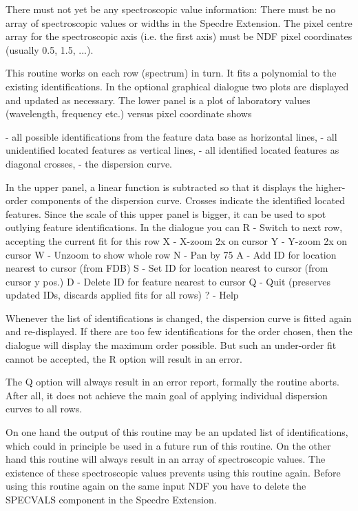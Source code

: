 \begin{description}
\begin{terminalv}
   There must not yet be any spectroscopic value information: There
   must be no array of spectroscopic values or widths in the Specdre
   Extension. The pixel centre array for the spectroscopic axis
   (i.e. the first axis) must be NDF pixel coordinates (usually 0.5,
   1.5, ...).

   This routine works on each row (spectrum) in turn. It fits a
   polynomial to the existing identifications. In the optional
   graphical dialogue two plots are displayed and updated as
   necessary. The lower panel is a plot of laboratory values
   (wavelength, frequency etc.) versus pixel coordinate shows

   -  all possible identifications from the feature data base as
      horizontal lines,
   -  all unidentified located features as vertical lines,
   -  all identified located features as diagonal crosses,
   -  the dispersion curve.

   In the upper panel, a linear function is subtracted so that it
   displays the higher-order components of the dispersion curve.
   Crosses indicate the identified located features. Since the scale
   of this upper panel is bigger, it can be used to spot outlying
   feature identifications. In the dialogue you can
      R - Switch to next row, accepting the current fit for this row
      X - X-zoom 2x on cursor
      Y - Y-zoom 2x on cursor
      W - Unzoom to show whole row
      N - Pan by 75%
      A - Add ID for location nearest to cursor (from FDB)
      S - Set ID for location nearest to cursor (from cursor y pos.)
      D - Delete ID for feature nearest to cursor
      Q - Quit (preserves updated IDs, discards applied fits for all
          rows)
      ? - Help

   Whenever the list of identifications is changed, the dispersion
   curve is fitted again and re-displayed. If there are too few
   identifications for the order chosen, then the dialogue will
   display the maximum order possible. But such an under-order fit
   cannot be accepted, the R option will result in an error.

   The Q option will always result in an error report, formally the
   routine aborts. After all, it does not achieve the main goal of
   applying individual dispersion curves to all rows.

   On one hand the output of this routine may be an updated list of
   identifications, which could in principle be used in a future run
   of this routine. On the other hand this routine will always
   result in an array of spectroscopic values. The existence of
   these spectroscopic values prevents using this routine again.
   Before using this routine again on the same input NDF you have to
   delete the SPECVALS component in the Specdre Extension.


\end{terminalv}
\end{description}
